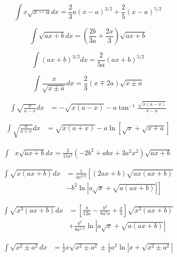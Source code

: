 \documentclass[11pt,twoside]{article}
\begin{document}
\begin{multicols}{3}
\begin{footnotesize}
\begin{equation}
\int x\sqrt{x-a} dx = \frac{2}{3}a(x-a)^{3/2}+\frac{2}{5}(x-a)^{5/2}
\end{equation}

\begin{equation}
\int \sqrt{ax+b}dx = \left(\frac{2b}{3a}+\frac{2x}{3}\right)\sqrt{ax+b}
\end{equation}

\begin{equation}
\int (ax+b)^{3/2}dx =\frac{2}{5a}(ax+b)^{5/2}
\end{equation}

\begin{equation}
\int \frac{x}{\sqrt{x\pm a} } dx = \frac{2}{3}(x\mp 2a)\sqrt{x\pm a}
\end{equation}

\begin{align}
\int \sqrt{\frac{x}{a-x}}dx &=  -\sqrt{x(a-x)}
-a\tan^{-1}\frac{\sqrt{x(a-x)}}{x-a}
\end{align}

\begin{align}
\int \sqrt{\frac{x}{a+x}}dx &=  \sqrt{x(a+x)}
-a\ln \left [ \sqrt{x} + \sqrt{x+a}\right]
\end{align}

\begin{align}
\int &x \sqrt{ax + b}dx =
\frac{2}{15 a^2}(-2b^2+abx + 3 a^2 x^2)
\sqrt{ax+b}
\end{align}

\begin{align}
\int \sqrt{x(ax+b)} dx &= \frac{1}{4a^{3/2}}\left[(2ax + b)\sqrt{ax(ax+b)} \right. \nonumber
\\& \left.
-b^2 \ln \left| a\sqrt{x} + \sqrt{a(ax+b)} \right| \right ]
\end{align}

\begin{align}
\int \sqrt{x^3(ax+b)} dx &=\left [
\frac{b}{12a}-
\frac{b^2}{8a^2x}+
\frac{x}{3}\right]
\sqrt{x^3(ax+b)} \nonumber \\& +
\frac{b^3}{8a^{5/2}}\ln \left | a\sqrt{x} + \sqrt{a(ax+b)} \right |
\end{align}

\begin{align}
\int\sqrt{x^2 \pm a^2} dx &= \frac{1}{2}x\sqrt{x^2\pm a^2}
\pm\frac{1}{2}a^2 \ln \left | x + \sqrt{x^2\pm a^2} \right |
\end{align}


\end{footnotesize}
\end{multicols}
\end{document}
